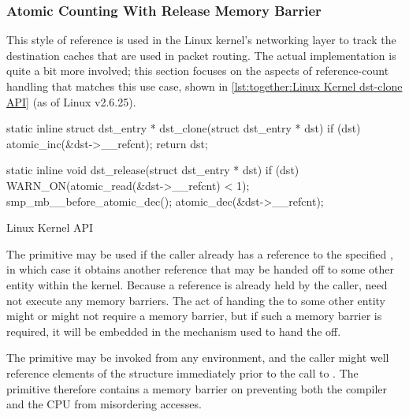 \subsubsection{Atomic Counting With Release Memory Barrier}
\label{sec:together:Atomic Counting With Release Memory Barrier}

This style of reference is used in the Linux kernel's networking
layer to track the destination caches that are used in packet routing.
The actual implementation is quite a bit more involved; this section
focuses on the aspects of  reference-count
handling that matches this use case,
shown in \cref{lst:together:Linux Kernel dst-clone API}
(as of Linux v2.6.25).

\begin{listing}[tbp]
\begin{fcvlabel}
\begin{VerbatimL}[commandchars=\\\[\]]
static inline
struct dst_entry * dst_clone(struct dst_entry * dst)
{
	if (dst)
		atomic_inc(&dst->__refcnt);
	return dst;
}

static inline
void dst_release(struct dst_entry * dst)
{
	if (dst) {
		WARN_ON(atomic_read(&dst->__refcnt) < 1);
		smp_mb__before_atomic_dec();		\lnlbl[mb]
		atomic_dec(&dst->__refcnt);
	}
}
\end{VerbatimL}
\end{fcvlabel}
\caption{Linux Kernel  API}
\label{lst:together:Linux Kernel dst-clone API}
\end{listing}

The  primitive may be used if the caller
already has a reference to the specified ,
in which case it obtains another reference that may be handed off
to some other entity within the kernel.
Because a reference is already held by the caller, 
need not execute any memory barriers.
The act of handing the  to some other entity might
or might not require a memory barrier, but if such a memory barrier
is required, it will be embedded in the mechanism used to hand the
 off.

\begin{fcvref}
The  primitive may be invoked from any environment,
and the caller might well reference elements of the 
structure immediately prior to the call to .
The  primitive therefore contains a memory
barrier on  preventing both the compiler and the CPU
from misordering accesses.
\end{fcvref}

